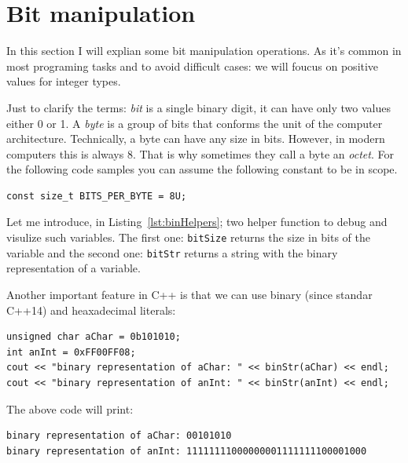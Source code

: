 \section{Bit manipulation}

In this section I will explian some bit manipulation operations. As it's common in most programing tasks and to avoid difficult cases: we will foucus on positive values for integer types.

Just to clarify the terms: \emph{bit} is a single binary digit, it can have only two values either 0 or 1. A \emph{byte} is a group of bits that conforms the unit of the computer architecture. Technically, a byte can have any size in bits. However, in modern computers this is always 8. That is why sometimes they call a byte an \emph{octet}. For the following code samples you can assume the following constant to be in scope.

\begin{verbatim}
const size_t BITS_PER_BYTE = 8U;
\end{verbatim}

Let me introduce, in Listing~\ref{lst:binHelpers}; two helper function to debug and visulize such variables. The first one: \texttt{bitSize} returns the size in bits of the variable and the second one: \texttt{bitStr} returns a string with the binary representation of a variable.

{\centering
\begin{minipage}{\linewidth}
\end{minipage}
\par
}

Another important feature in C++ is that we can use binary (since standar C++14) and heaxadecimal literals:
\begin{verbatim}
unsigned char aChar = 0b101010;
int anInt = 0xFF00FF08;
cout << "binary representation of aChar: " << binStr(aChar) << endl;
cout << "binary representation of anInt: " << binStr(anInt) << endl;
\end{verbatim}
The above code will print:
\begin{verbatim}
binary representation of aChar: 00101010
binary representation of anInt: 11111111000000001111111100001000
\end{verbatim} 

